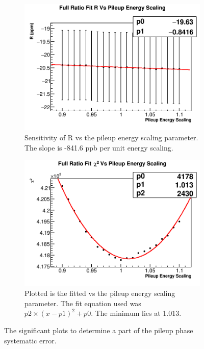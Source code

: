 		\begin{figure}[]
		\centering
		    \begin{subfigure}[t]{0.45\textwidth}
			    \centering
				\includegraphics[width=\textwidth]{RatioCBO_R_Vs_PileupEnergyScaling_Canv}
			    \caption{Sensitivity of R vs the pileup energy scaling parameter. The slope is -841.6 ppb per unit energy scaling.}
		    \end{subfigure}
		    \hspace{4mm}
		    \begin{subfigure}[t]{0.45\textwidth}
			    \centering
				\includegraphics[width=\textwidth]{RatioCBO_Chi2_Vs_PileupEnergyScaling_Canv}
			    \caption{Plotted is the fitted \chisq vs the pileup energy scaling parameter. The fit equation used was $p2 \times (x - p1)^{2} + p0.$ The minimum lies at 1.013.}
		    \end{subfigure}
		\caption[PileupEnergyScaling]{The significant plots to determine a part of the pileup phase systematic error.}
		\label{fig:PileupEnergyScaling}
		\end{figure}


